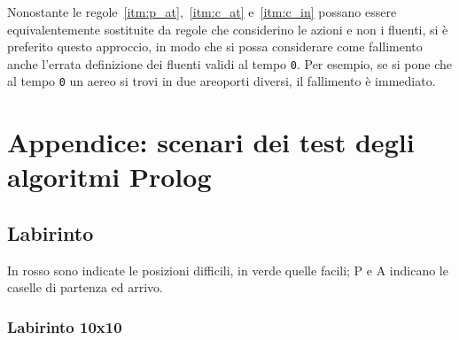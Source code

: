 \documentclass[a4paper,oneside,12pt]{book}
\newcommand*{\TextColumnTen}[3]{%
\foreach \x/\y/\text in {#1} {
\node [draw=none, thick]
at (\x-.5,#2+0.5-\y) {\text};
}%
}%
\newcommand*{\ColorCellsTen}[3]{%
\foreach \x/\y/\color in {#1} {
\node [fill=\color, draw=none, thick, minimum size=#3]
at (\x-.5,#2+0.5-\y) {};
}%
}%
\newcommand*{\ColorCellsBlackTen}[3]{%
\foreach \x/\y in {#1} {
\node [fill=black, draw=none, thick, minimum size=#3]
at (\x-.5,#2+0.5-\y) {};
}%
}%
\begin{document}
    Nonostante le regole~\ref{itm:p_at},~\ref{itm:c_at} e~\ref{itm:c_in} possano essere equivalentemente
    sostituite da regole che considerino le azioni e non i fluenti, si è preferito questo approccio, in modo
    che si possa considerare come fallimento anche l'errata definizione dei fluenti validi al tempo \texttt{0}.
    Per esempio, se si pone che al tempo \texttt{0} un aereo si trovi in due areoporti diversi, il fallimento è
    immediato.








    \newpage
    \noindent\section*{Appendice: scenari dei test degli algoritmi Prolog}
    \subsection*{Labirinto}
    In rosso sono indicate le posizioni difficili, in verde quelle facili;
    P e A indicano le caselle di 	partenza ed arrivo.
    \subsubsection*{Labirinto 10x10}
    \begin{center}
    \end{center}
    \newpage
\end{document}
